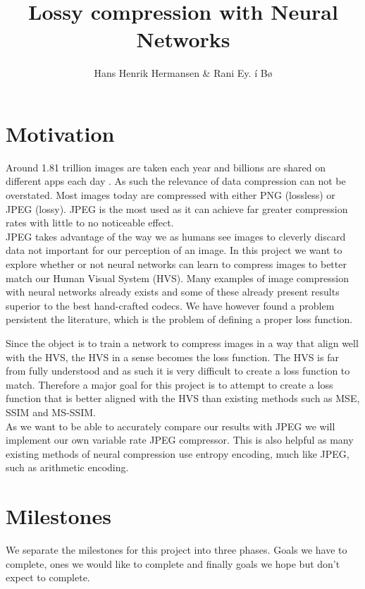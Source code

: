 \documentclass[]{article}
\begin{document}
\title{Lossy compression with Neural Networks}

\author{Hans Henrik Hermansen \& Rani Ey. í Bø}
\maketitle

\section*{Motivation}

Around 1.81 trillion images are taken each year and billions are shared on different apps each day \cite{imagestaken}. As such the relevance of data compression can not be overstated. Most images today are compressed with either PNG (lossless) or JPEG (lossy). JPEG is the most used \cite{jpegCommon} as it can achieve far greater compression rates with little to no noticeable effect. \\

JPEG takes advantage of the way we as humans see images to cleverly discard data not important for our perception of an image. In this project we want to explore whether or not neural networks can learn to compress images to better match our Human Visual System (HVS). Many examples of image compression with neural networks already exists\cite{benchmark} and some of these already present results superior to the best hand-crafted codecs. We have however found a problem persistent the literature, which is the problem of defining a proper loss function.

Since the object is to train a network to compress images in a way that align well with the HVS, the HVS in a sense becomes the loss function. The HVS is far from fully understood\cite{hvs} and as such it is very difficult to create a loss function to match. Therefore a major goal for this project is to attempt to create a loss function that is better aligned with the HVS than existing methods such as MSE\cite{msebad}, SSIM\cite{SSIM} and MS-SSIM\cite{MSSSIM}.
\\

As we want to be able to accurately compare our results with JPEG we will implement our own variable rate JPEG compressor. This is also helpful as many existing methods of neural compression use entropy encoding, much like JPEG, such as arithmetic encoding. 

\section*{Milestones}
We separate the milestones for this project into three phases. Goals we have to complete, ones we would like to complete and finally goals we hope but don't expect to complete. 
\end{document}
